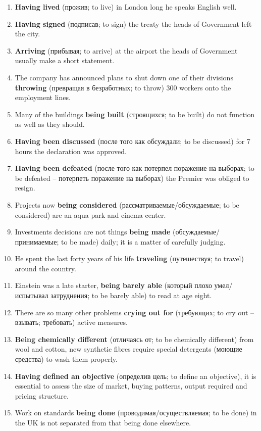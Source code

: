 \documentclass[main.tex]{subfiles}
\begin{document}
\begin{enumerate}[nosep,leftmargin=*]
	\itemsep\eitsp
	\item \textbf{Having lived} (прожив; to live) in London long he speaks English well.
	\item \textbf{Having signed} (подписав; to sign) the treaty the heads of Government left the city.
	\item \textbf{Arriving} (прибывая; to arrive) at the airport the heads of Government usually make a short statement.
	\item The company has announced plans to shut down one of their divisions \textbf{throwing} (превращая в безработных; to throw) 300 workers onto the employment lines.
	\item Many of the buildings \textbf{being built} (строящихся; to be built) do not function as well as they should.
	\item \textbf{Having been discussed} (после того как обсуждали; to be discussed) for 7 hours the declaration was approved.
	\item \textbf{Having been defeated} (после того как потерпел поражение на выборах; to be defeated -- потерпеть поражение на выборах) the Premier was obliged to resign.
	\item Projects now \textbf{being considered} (рассматриваемые/обсуждаемые; to be considered) are an aqua park and cinema center.
	\item Investments decisions are not things \textbf{being made} (обсуждаемые/принимаемые; to be made) daily; it is a matter of carefully judging.
	\item He spent the last forty years of his life \textbf{traveling} (путешествуя; to travel) around the country.
	\item Einstein was a late starter, \textbf{being barely able} (который плохо умел/испытывал затруднения; to be barely able) to read at age eight.
	\item There are so many other problems \textbf{crying out for} (требующих; to cry out -- взывать; требовать) active measures.
	\item \textbf{Being chemically different} (отличаясь от; to be chemically different) from wool and cotton, new synthetic fibres require special detergents (моющие средства) to wash them properly.
	\item \textbf{Having defined an objective} (определив цель; to define an objective), it is essential to assess the size of market, buying patterns, output required and pricing structure.
	\item Work on standards \textbf{being done} (проводимая/осуществляемая; to be done) in the UK is not separated from that being done elsewhere.
\end{enumerate}
\end{document}

